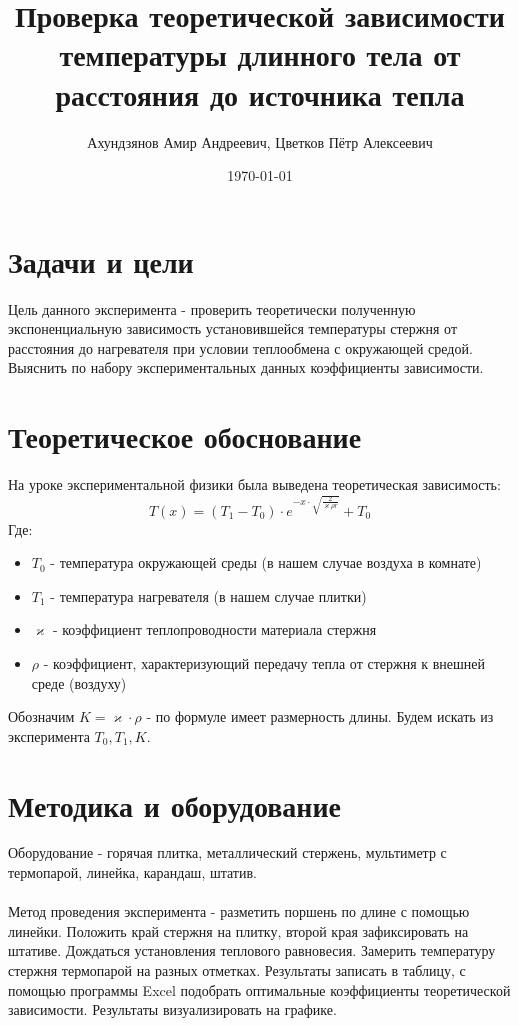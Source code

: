 \documentclass[a4paper,12pt]{article}
\begin{document}
\title{Проверка теоретической зависимости температуры длинного тела от расстояния до источника тепла}
\author{Ахундзянов Амир Андреевич, Цветков Пётр Алексеевич}
\date{\today}
\maketitle

\section{Задачи и цели}

Цель данного эксперимента - проверить теоретически полученную экспоненциальную зависимость установившейся температуры стержня от расстояния до нагревателя при условии теплообмена с окружающей средой. Выяснить по набору экспериментальных данных коэффициенты зависимости.


\section{Теоретическое обоснование}

На уроке экспериментальной физики была выведена теоретическая зависимость: 
{\Large $$T(x) = (T_1 - T_0) \cdot e ^ {- x \cdot \sqrt{\frac{2}{\varkappa \rho r}}} + T_0$$}
Где: 
\begin{itemize}
\item $T_0$ - температура окружающей среды (в нашем случае воздуха в комнате)
\item $T_1$ - температура нагревателя (в нашем случае плитки)
\item $\varkappa$ - коэффициент теплопроводности материала стержня
\item $\rho$ - коэффициент, характеризующий передачу тепла от стержня к внешней среде (воздуху)
\end{itemize}
Обозначим $K = \varkappa \cdot \rho$ - по формуле имеет размерность длины. Будем искать из эксперимента $T_0, T_1, K$.

\section{Методика и оборудование}
Оборудование - горячая плитка, металлический стержень, мультиметр с термопарой, линейка, карандаш, штатив. \\\\

Метод проведения эксперимента - разметить поршень по длине с помощью линейки. Положить край стержня на плитку, второй края зафиксировать на штативе. Дождаться установления теплового равновесия. Замерить температуру стержня термопарой на разных отметках. Результаты записать в таблицу, с помощью программы Excel подобрать оптимальные коэффициенты теоретической зависимости. Результаты визуализировать на графике.
\end{document}
